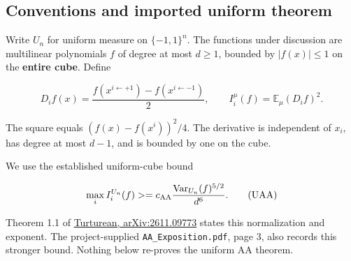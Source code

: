 \subsection{Conventions and imported uniform theorem}\label{ht:conventions-and-imported-uniform-theorem}

Write \(U_n\) for uniform measure on \(\{-1,1\}^n\). The functions under discussion are multilinear polynomials \(f\) of degree at most \(d\ge 1\), bounded by \(|f(x)|\le 1\) on the \textbf{entire cube}. Define

\[
 D_i f(x)=\frac{f(x^{i\leftarrow+1})-f(x^{i\leftarrow-1})}{2},
 \qquad I_i^\mu(f)=\mathbb E_\mu (D_i f)^2.
\]

The square equals \((f(x)-f(x^i))^2/4\). The derivative is independent of \(x_i\), has degree at most \(d-1\), and is bounded by one on the cube.

We use the established uniform-cube bound

\[
 \max_i I_i^{U_n}(f)\ge c_{\rm AA}
 \frac{\operatorname{Var}_{U_n}(f)^{5/2}}{d^6}.
 \tag{UAA}
\]

Theorem 1.1 of \href{https://arxiv.org/abs/2611.09773}{Turturean, arXiv:2611.09773} states this normalization and exponent. The project-supplied \texttt{AA\_Exposition.pdf}, page 3, also records this stronger bound. Nothing below re-proves the uniform AA theorem.
